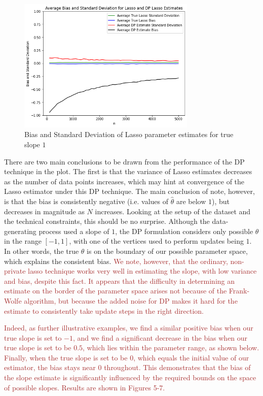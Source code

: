 \documentclass[11pt,conference]{IEEEtran}
\begin{document}
\begin{figure}[htbp]
\centerline{\includegraphics[width=8.5cm]{plots/lasso_1.png}}
\caption{Bias and Standard Deviation of Lasso parameter estimates for true slope $1$}
\label{fig}
\end{figure}

There are two main conclusions to be drawn from the performance of the DP technique in the plot. The first is that the variance of Lasso estimates decreases as the number of data points increases, which may hint at convergence of the Lasso estimator under this DP technique. The main conclusion of note, however, is that the bias is consistently negative (i.e. values of $\hat{\theta}$ are below $1$), but decreases in magnitude as $N$ increases. Looking at the setup of the dataset and the technical constraints, this should be no surprise. Although the data-generating process used a slope of $1$, the DP formulation considers only possible $\theta$ in the range $[-1,1]$, with one of the vertices used to perform updates being $1$. In other words, the true $\theta$ is on the boundary of our possible parameter space, which explains the consistent bias. \textcolor{brown}{We note, however, that the ordinary, non-private lasso technique works very well in estimating the slope, with low variance and bias, despite this fact. It appears that the difficulty in determining an estimate on the border of the parameter space arises not because of the Frank-Wolfe algorithm, but because the added noise for DP makes it hard for the estimate to consistently take update steps in the right direction.} 

\textcolor{brown}{Indeed, as further illustrative examples, we find a similar positive bias when our true slope is set to $-1$, and we find a significant decrease in the bias when our true slope is set to be $0.5$, which lies within the parameter range, as shown below. Finally, when the true slope is set to be $0$, which equals the initial value of our estimator, the bias stays near $0$ throughout. This demonstrates that the bias of the slope estimate is significantly influenced by the required bounds on the space of possible slopes. Results are shown in Figures 5-7.}
\end{document}
